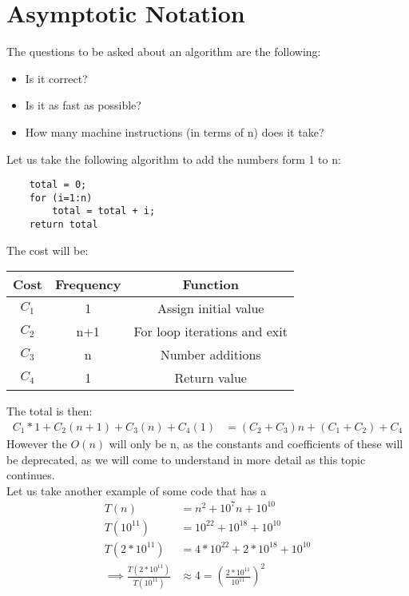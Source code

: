 \documentclass[nobib]{tufte-handout}
\begin{document}
\section{Asymptotic Notation}
The questions to be asked about an algorithm are the following:
\begin{itemize}
    \item Is it correct?
    \item Is it as fast as possible?
    \item How many machine instructions (in terms of n) does it take?
\end{itemize}
Let us take the following algorithm to add the numbers form 1 to n:
\begin{lstlisting}
    total = 0;
    for (i=1:n)
        total = total + i;
    return total
\end{lstlisting}
The cost will be:\\
\begin{table}
    \centering
    \begin{tabular}{c|c|c}
        Cost  & Frequency & Function                     \\
        \hline
        $C_1$ & 1         & Assign initial value         \\
        $C_2$ & n+1       & For loop iterations and exit \\
        $C_3$ & n         & Number additions             \\
        $C_4$ & 1         & Return value                 \\
    \end{tabular}
\end{table}
\FloatBarrier
The total is then:\\
\begin{align*}
    C_1*1+C_2(n+1)+C_3(n)+C_4(1) & = (C_2+C_3)n+ (C_1+C_2)+C_4
\end{align*}
However the $O(n)$ will only be n, as the constants and coefficients of these will be deprecated, as we will come to understand in more detail as this topic continues.\\
Let us take another example of some code that has a
\begin{align*}
    T(n)                                     & = n^2 + 10^7n+10^{10}                                \\
    T(10^{11})                               & = 10^{22} + 10^{18}+ 10^{10}                         \\
    T(2*10^{11})                             & = 4*10^{22} + 2*10^{18}+ 10^{10}                     \\
    \implies \frac{T(2*10^{11})}{T(10^{11})} & \approx 4 = \left(\frac{2*10^{11}}{10^{11}}\right)^2
\end{align*}
\end{document}
